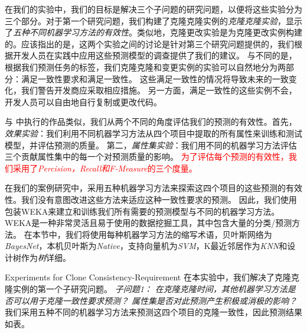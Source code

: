 在我们的实验中，我们的目标是解决三个子问题的研究问题，以便将这些实验分为三个部分。对于第一个研究问题，我们构建了克隆克隆实例的{\em 克隆克隆实验}，显示了{\em 五种不同机器学习方法的有效性}。类似地，克隆更改实验是为克隆更改实例构建的。应该指出的是，这两个实验之间的讨论是针对第三个研究问题提供的，我们根据开发人员在实践中应用这些预测模型的调查提供了我们的建议。
与不同的是，根据我们预测任务的标签，我们克隆克隆和变更实例的实验可以自然地分为两部分：满足一致性要求和满足一致性。
这些满足一致性的情况将导致未来的一致变化，我们警告开发商应采取相应措施。
另一方面，满足一致性的这些实例不会，开发人员可以自由地自行复制或更改代码。

与\cite{wang2014predicting} \cite{zhang2016predicting}中执行的作品类似，我们从两个不同的角度评估我们的预测的有效性。首先，{\em  效果实验\/}：我们利用不同机器学习方法从四个项目中提取的所有属性来训练和测试模型，并评估预测的质量。
第二，{\em 属性集实验\/}：我们用不同的机器学习方法评估三个贡献属性集中的每一个对预测质量的影响。
\textcolor{red}{为了评估每个预测的有效性，我们采用了{\em Percision，Recall和F-Measure}的三个度量。}

在我们的案例研究中，采用五种机器学习方法来探索这四个项目的这些预测的有效性。我们没有意图改进这些方法来适应这种一致性要求的预测。
因此，我们使用包装WEKA来建立和训练我们所有需要的预测模型与不同的机器学习方法。WEKA是一种非常灵活且易于使用的数据挖掘工具，其中包含大量的分类/预测方法\cite{hall2009weka}。
在本节中，我们将使用每种机器学习方法的缩写术语，贝叶斯网络为{\em BayesNet}，本机贝叶斯为{\em Native}，支持向量机为{\em SVM}，K最近邻居作为{\em KNN}和设计树作为{\em 树}详细。

{Experiments for Clone Consistency-Requirement}
在本实验中，我们解决了克隆克隆实例的第一个子研究问题。
{\em {子问题1：}
在克隆克隆时间，其他机器学习方法是否可以用于克隆一致性要求预测？
属性集是否对此预测产生积极或消极的影响？}
我们采用五种不同的机器学习方法来预测这四个项目的克隆一致性，因此预测结果如表。

